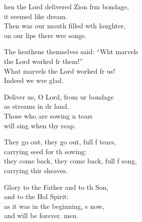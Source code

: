\settowidth{\versewidth}{they come back, they come back, full of song, *}
\begin{psalmverse}%
  \begin{patverse}
hen the Lord delivered Zion frm bondage,\Med\\
it seemed like  dream.\\
Then was our mouth filled w\pointup{\i}th laughter,\Med\\
on our lips there wre songs.

The heathens themselves said: “Wht marvels\Med\\
the Lord worked fr them!”\\
What marvels the Lord worked fr us!\Med\\
Indeed we wre glad.

Deliver us, O Lord, from ur bondage\Med\\
as streams in dr land.\\
Those who are sowing \pointup{\i}n tears\Med\\
will sing when thy reap.

They go out, they go out, full f tears,\Med\\
carrying seed for th sowing:\\
they come back, they come back, full f song,\Med\\
carrying thir sheaves.

Glory to the Father and to th Son,\Med\\
and to the Hol Spirit:\\
as it was in the beginning, \pointup{\i}s now,\Med\\
and will be forever. men. 
  \end{patverse}
\end{psalmverse}
